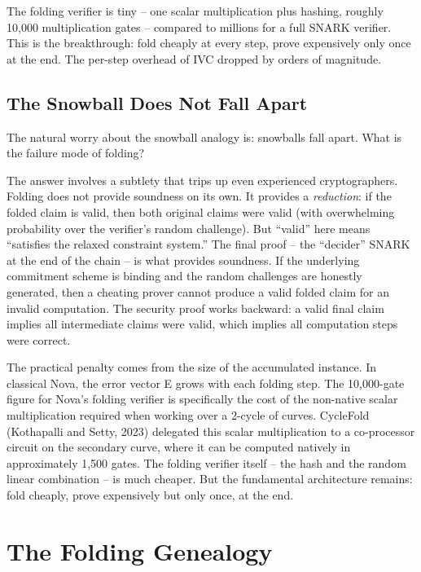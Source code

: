 \documentclass[
  11pt,
  openany]{report}
\begin{document}
The folding verifier is tiny -- one scalar multiplication plus hashing, roughly
10,000 multiplication gates -- compared to millions for a full SNARK verifier.
This is the breakthrough: fold cheaply at every step, prove expensively only
once at the end. The per-step overhead of IVC dropped by orders of magnitude.

\subsection{The Snowball Does Not Fall
Apart}\label{the-snowball-does-not-fall-apart}

The natural worry about the snowball analogy is: snowballs fall apart. What is
the failure mode of folding?

The answer involves a subtlety that trips up even experienced cryptographers.
Folding does not provide soundness on its own. It provides a \emph{reduction}:
if the folded claim is valid, then both original claims were valid (with
overwhelming probability over the verifier's random challenge). But ``valid''
here means ``satisfies the relaxed constraint system.'' The final proof -- the
``decider'' SNARK at the end of the chain -- is what provides soundness. If the
underlying commitment scheme is binding and the random challenges are honestly
generated, then a cheating prover cannot produce a valid folded claim for an
invalid computation. The security proof works backward: a valid final claim
implies all intermediate claims were valid, which implies all computation steps
were correct.

The practical penalty comes from the size of the accumulated instance. In
classical Nova, the error vector E grows with each folding step. The 10,000-gate
figure for Nova's folding verifier is specifically the cost of the non-native
scalar multiplication required when working over a 2-cycle of curves. CycleFold
(Kothapalli and Setty, 2023) delegated this scalar multiplication to a
co-processor circuit on the secondary curve, where it can be computed natively
in approximately 1,500 gates. The folding verifier itself -- the hash and the
random linear combination -- is much cheaper. But the fundamental architecture
remains: fold cheaply, prove expensively but only once, at the end.

\section{The Folding Genealogy}\label{the-folding-genealogy}
\end{document}
